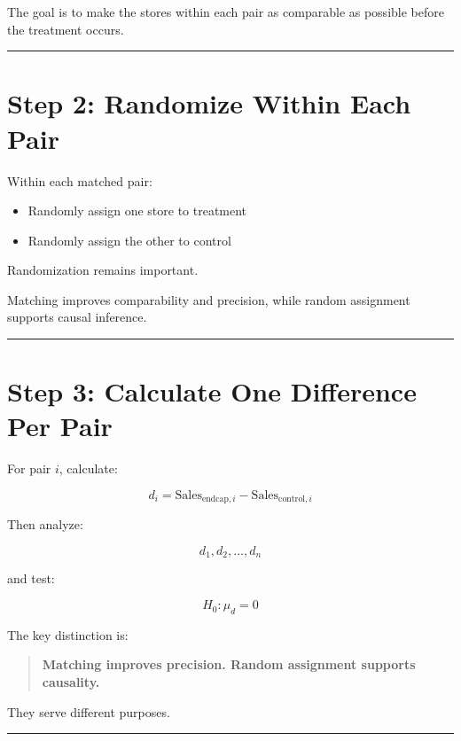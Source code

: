 \documentclass[
  letterpaper,
  DIV=11,
  numbers=noendperiod]{scrreprt}
\providecommand{\tightlist}{%
  \setlength{\itemsep}{0pt}\setlength{\parskip}{0pt}}
\begin{document}
The goal is to make the stores within each pair as comparable as
possible before the treatment occurs.

\begin{center}\rule{0.5\linewidth}{0.5pt}\end{center}

\section{Step 2: Randomize Within Each
Pair}\label{step-2-randomize-within-each-pair}

Within each matched pair:

\begin{itemize}
\tightlist
\item
  Randomly assign one store to treatment
\item
  Randomly assign the other to control
\end{itemize}

Randomization remains important.

Matching improves comparability and precision, while random assignment
supports causal inference.

\begin{center}\rule{0.5\linewidth}{0.5pt}\end{center}

\section{Step 3: Calculate One Difference Per
Pair}\label{step-3-calculate-one-difference-per-pair}

For pair \(i\), calculate:

\[
d_i
=
\text{Sales}_{\text{endcap},i}
-
\text{Sales}_{\text{control},i}
\]

Then analyze:

\[
d_1,d_2,\ldots,d_n
\]

and test:

\[
H_0:\mu_d=0
\]

The key distinction is:

\begin{quote}
\textbf{Matching improves precision. Random assignment supports
causality.}
\end{quote}

They serve different purposes.

\begin{center}\rule{0.5\linewidth}{0.5pt}\end{center}
\end{document}
